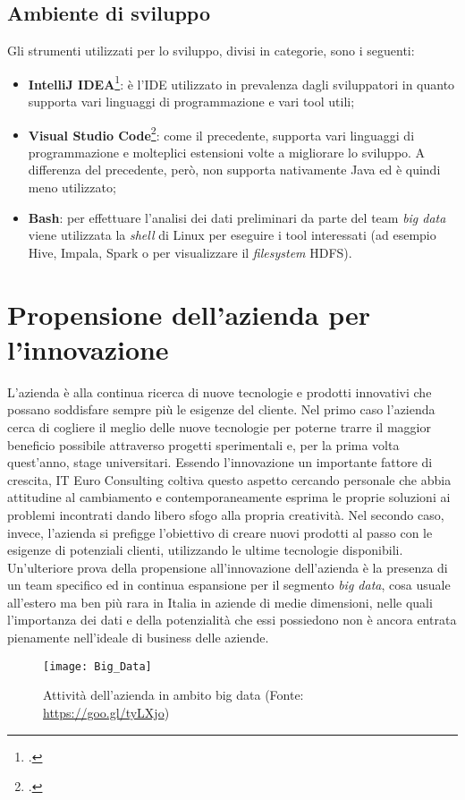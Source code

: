 \subsection{Ambiente di sviluppo}
Gli strumenti utilizzati per lo sviluppo, divisi in categorie, sono i seguenti:
\begin{itemize}
	\item \textbf{IntelliJ IDEA}\footcite{https://www.jetbrains.com/idea/}: è l'\gls{IDE} utilizzato in prevalenza dagli sviluppatori in quanto supporta vari linguaggi di programmazione e vari tool utili;
	\item \textbf{Visual Studio Code}\footcite{https://code.visualstudio.com/}: come il precedente, supporta vari linguaggi di programmazione e molteplici estensioni volte a migliorare lo sviluppo. A differenza del precedente, però, non supporta nativamente Java ed è quindi meno utilizzato;
	\item \textbf{\gls{Bash}}: per effettuare l'analisi dei dati preliminari da parte del team \textit{big data} viene utilizzata la \textit{shell} di Linux per eseguire i tool interessati (ad esempio Hive, Impala, Spark o per visualizzare il \textit{filesystem} \gls{HDFS}).
\end{itemize}

\section{Propensione dell'azienda per l'innovazione}
L’azienda è alla continua ricerca di nuove tecnologie e prodotti innovativi che possano soddisfare sempre più le esigenze del cliente. Nel primo caso l’azienda cerca di cogliere il meglio delle nuove tecnologie per poterne trarre il maggior beneficio possibile attraverso progetti sperimentali e, per la prima volta quest’anno, stage universitari. Essendo l’innovazione un importante fattore di crescita, IT Euro Consulting coltiva questo aspetto cercando personale che abbia attitudine al cambiamento e contemporaneamente esprima le proprie soluzioni ai problemi incontrati dando libero sfogo alla propria creatività. Nel secondo caso, invece, l’azienda si prefigge l’obiettivo di creare nuovi prodotti al passo con le esigenze di potenziali clienti, utilizzando le ultime tecnologie disponibili.\\
Un'ulteriore prova della propensione all'innovazione dell'azienda è la presenza di un team specifico ed in continua espansione per il segmento \textit{big data}, cosa usuale all'estero ma ben più rara in Italia in aziende di medie dimensioni, nelle quali l'importanza dei dati e della potenzialità che essi possiedono non è ancora entrata pienamente nell'ideale di business delle aziende.
\begin{figure}[!h] 
	\centering 
	\texttt{[image: Big\_Data]} 
	\caption{Attività dell'azienda in ambito big data (Fonte: \href{https://goo.gl/tyLXjo}{https://goo.gl/tyLXjo})}
\end{figure}

